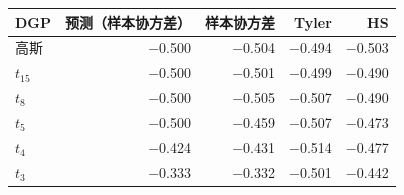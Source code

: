 \begin{tabular}{lrrrr}
\toprule
DGP & 预测（样本协方差） & 样本协方差 & Tyler & HS \\
\midrule
高斯 & $-$0.500 & $-$0.504 & $-$0.494 & $-$0.503 \\
$t_{15}$ & $-$0.500 & $-$0.501 & $-$0.499 & $-$0.490 \\
$t_8$ & $-$0.500 & $-$0.505 & $-$0.507 & $-$0.490 \\
$t_5$ & $-$0.500 & $-$0.459 & $-$0.507 & $-$0.473 \\
$t_4$ & $-$0.424 & $-$0.431 & $-$0.514 & $-$0.477 \\
$t_3$ & $-$0.333 & $-$0.332 & $-$0.501 & $-$0.442 \\
\bottomrule
\end{tabular}